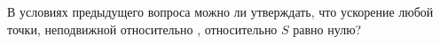 В условиях предыдущего вопроса можно ли утверждать, что ускорение
любой точки, неподвижной относительно  , относительно $S$ равно нулю?

